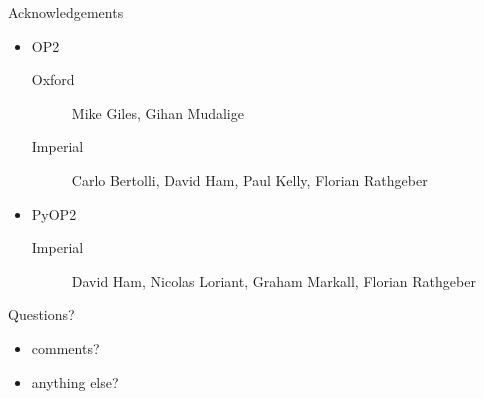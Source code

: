 \documentclass[bigger]{beamer}
\begin{document}
\begin{frame}[label={sec:orgheadline31}]{Acknowledgements}
\begin{itemize}
\item OP2
\begin{description}
\item[{Oxford}] Mike Giles, Gihan Mudalige
\item[{Imperial}] Carlo Bertolli, David Ham, Paul Kelly, Florian Rathgeber
\end{description}
\item PyOP2
\begin{description}
\item[{Imperial}] David Ham, Nicolas Loriant, Graham Markall, Florian Rathgeber
\end{description}
\end{itemize}
\end{frame}

\begin{frame}[label={sec:orgheadline32}]{Questions?}
\begin{itemize}
\item comments?
\item anything else?
\end{itemize}
\end{frame}
\end{document}
